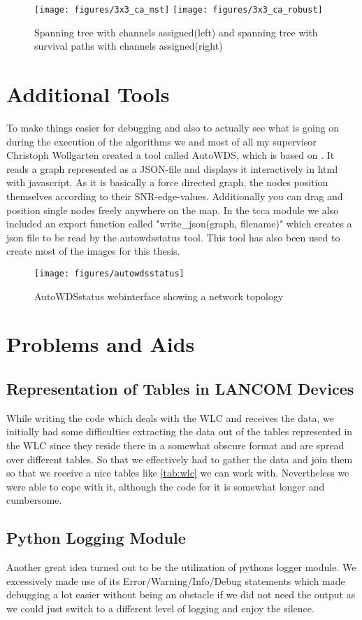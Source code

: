     \begin{figure}[t]
      \centering
      \texttt{[image: figures/3x3\_ca\_mst]}
      \texttt{[image: figures/3x3\_ca\_robust]}
      \caption{Spanning tree with channels assigned(left) and spanning tree with survival paths with channels assigned(right)}
      \label{fig:3x3third}
    \end{figure}
\section{Additional Tools}
  To make things easier for debugging and also to actually see what is going on during the execution of the algorithms we and most of all my supervisor Christoph
  Wollgarten created a tool called AutoWDS, which is based on \cite{d3js}. It reads a graph represented as a \ac{JSON}-file and displays it interactively in html with javascript.
  As it is basically a force directed graph, the nodes position themselves according to their SNR-edge-values. Additionally you can drag and position single nodes freely
  anywhere on the map.
  In the tcca module we also included an export function called "write\_json(graph, filename)" which creates a json file to be read by the autowdsstatus tool.
  This tool has also been used to create most of the images for this thesis.
  
  \begin{figure}[t]
    \centering
    \texttt{[image: figures/autowdsstatus]}
    \caption{AutoWDSstatus webinterface showing a network topology}
    \label{fig:autowdsstatus}
  \end{figure}
  
\section{Problems and Aids}
  \subsection{Representation of Tables in LANCOM Devices}
    While writing the code which deals with the WLC and receives the data, we initially had some difficulties extracting the data out of the tables represented in the WLC since
    they reside there in a somewhat obscure format and are spread over different tables. So that we effectively had to gather the data and join them so that we receive a
    nice tables like \ref{tab:wlc} we can work with. Nevertheless we were able to cope with it, although the code for it is somewhat longer and cumbersome.
  \subsection{Python Logging Module}
    Another great idea turned out to be the utilization of pythons logger module. We excessively made use of its Error/Warning/Info/Debug statements which made debugging
    a lot easier without being an obstacle if we did not need the output as we could just switch to a different level of logging and enjoy the silence.
  
